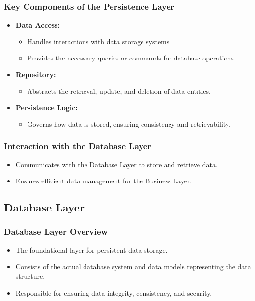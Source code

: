\documentclass[aspectratio=169, table]{beamer}
\begin{document}
\begin{frame}
	\frametitle{Key Components of the Persistence Layer}
	\begin{itemize}
		\item \textbf{Data Access:}
		\begin{itemize}
			\item Handles interactions with data storage systems.
			\item Provides the necessary queries or commands for database operations.
		\end{itemize}
		\item \textbf{Repository:}
		\begin{itemize}
			\item Abstracts the retrieval, update, and deletion of data entities.
		\end{itemize}
		\item \textbf{Persistence Logic:}
		\begin{itemize}
			\item Governs how data is stored, ensuring consistency and retrievability.
		\end{itemize}
	\end{itemize}
\end{frame}

\begin{frame}
	\frametitle{Interaction with the Database Layer}
	\begin{itemize}
		\item Communicates with the Database Layer to store and retrieve data.
		\item Ensures efficient data management for the Business Layer.
	\end{itemize}
\end{frame}

\subsection{Database Layer}

\begin{frame}
	\frametitle{Database Layer Overview}
	\begin{itemize}
		\item The foundational layer for persistent data storage.
		\item Consists of the actual database system and data models representing the data structure.
		\item Responsible for ensuring data integrity, consistency, and security.
	\end{itemize}
\end{frame}
\end{document}
